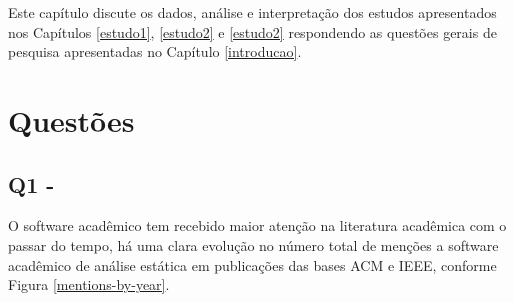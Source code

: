 \label{discussao}

Este capítulo discute os 
dados, análise e interpretação dos estudos apresentados nos Capítulos
\ref{estudo1}, \ref{estudo2} e \ref{estudo2}
respondendo as questões gerais de pesquisa apresentadas no Capítulo
\ref{introducao}.


\section{Questões} 

%
%



\subsection{Q1 - \QuestaoUm} %

O software acadêmico tem recebido maior atenção na literatura acadêmica com o
passar do tempo, há uma clara evolução no número total de menções a software
acadêmico de análise estática em publicações das bases ACM e IEEE, conforme
Figura \ref{mentions-by-year}.

